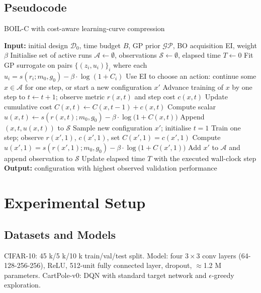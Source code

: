 \documentclass{article} %
\begin{document}
\subsection{Pseudocode}
\begin{algorithm}
\caption{BOIL-C with cost-aware learning-curve compression}
\begin{algorithmic}
  \State \textbf{Input:} initial design \(\mathcal{D}_0\), time budget \(B\), GP prior \(\mathcal{GP}\), BO acquisition EI, weight \(\beta\)
  \State Initialise set of active runs \(\mathcal{A} \leftarrow \emptyset\), observations \(\mathcal{S} \leftarrow \emptyset\), elapsed time \(T \leftarrow 0\)
    \State Fit GP surrogate on pairs \(\{(z_i, u_i)\}_{i}\) where each \(u_i = s(r_i; m_0, g_0) - \beta\cdot \log(1 + C_i)\)
    \State Use EI to choose an action: continue some \(x \in \mathcal{A}\) for one step, or start a new configuration \(x'\)
      \State Advance training of \(x\) by one step to \(t \leftarrow t+1\); observe metric \(r(x,t)\) and step cost \(c(x,t)\)
      \State Update cumulative cost \(C(x,t) \leftarrow C(x,t-1) + c(x,t)\)
      \State Compute scalar \(u(x,t) \leftarrow s(r(x,t); m_0, g_0) - \beta\cdot \log\big(1 + C(x,t)\big)\)
      \State Append \((x,t,u(x,t))\) to \(\mathcal{S}\)
    \Else
      \State Sample new configuration \(x'\); initialise \(t=1\)
      \State Train one step; observe \(r(x',1)\), \(c(x',1)\), set \(C(x',1)=c(x',1)\)
      \State Compute \(u(x',1) = s(r(x',1); m_0, g_0) - \beta\cdot \log\big(1 + C(x',1)\big)\)
      \State Add \(x'\) to \(\mathcal{A}\) and append observation to \(\mathcal{S}\)
    \EndIf
    \State Update elapsed time \(T\) with the executed wall-clock step
  \EndWhile
  \State \textbf{Output:} configuration with highest observed validation performance
\end{algorithmic}
\end{algorithm}

\section{Experimental Setup}
\label{sec:experimental}
\subsection{Datasets and Models}
CIFAR-10: 45 k/5 k/10 k train/val/test split. Model: four \(3\times 3\) conv layers (64-128-256-256), ReLU, 512-unit fully connected layer, dropout, \(\approx\)1.2 M parameters. CartPole-v0: DQN with standard target network and \(\epsilon\)-greedy exploration.
\end{document}
